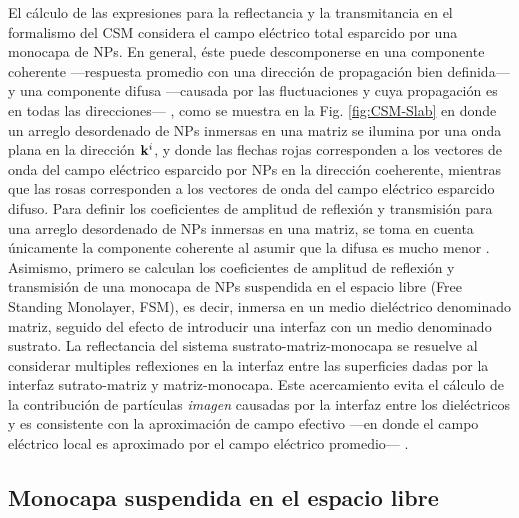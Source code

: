     El cálculo de las expresiones para la reflectancia y la transmitancia en el formalismo del CSM considera el campo eléctrico total esparcido por una monocapa de NPs. En general, éste puede descomponerse en una componente coherente ---respuesta promedio con una dirección de propagación bien definida--- y una componente difusa ---causada por las fluctuaciones y cuya propagación es en todas las direcciones--- \cite{tsang2000scattering}, como se muestra en la Fig. \ref{fig:CSM-Slab} en donde un arreglo desordenado de NPs inmersas en una matriz se ilumina por una onda plana en la dirección $\vb{k}^i$, y donde las flechas rojas corresponden a los vectores de onda del campo eléctrico esparcido por NPs en la dirección coeherente, mientras que las rosas corresponden a los vectores de onda del campo eléctrico esparcido difuso. Para definir los coeficientes de amplitud de reflexión y transmisión para una arreglo desordenado de NPs inmersas en una matriz, se toma en cuenta  únicamente la componente coherente al asumir que la difusa es mucho menor \cite{reyes2018analytical}. Asimismo, primero se calculan los coeficientes de amplitud de reflexión y transmisión de una monocapa de NPs suspendida en el espacio libre (Free Standing Monolayer, FSM), es decir, inmersa en un medio dieléctrico denominado matriz, seguido del efecto de introducir una interfaz con un medio denominado sustrato. La reflectancia del sistema sustrato-matriz-monocapa se resuelve al considerar  multiples reflexiones en la interfaz entre las superficies dadas por la interfaz sutrato-matriz y matriz-monocapa. Este acercamiento evita el  cálculo de la contribución de partículas \emph{imagen} causadas por la  interfaz entre los dieléctricos y es consistente con la aproximación de campo efectivo ---en donde el campo eléctrico local es aproximado por el campo eléctrico promedio--- \cite{reyes2018analytical}.
 
\subsection{Monocapa suspendida en el espacio libre}
 
